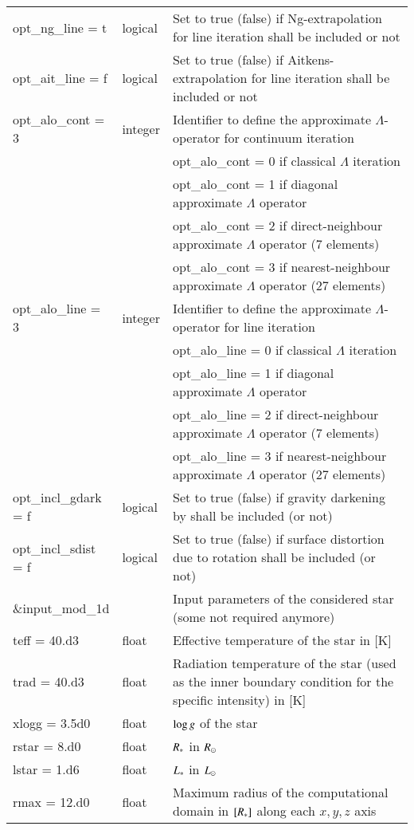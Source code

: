 \documentclass[10pt,a4paper]{article}
\begin{document}
\begin{footnotesize}
\begin{longtable}[h]{p{0.24\linewidth}p{0.07\linewidth}p{0.69\linewidth}}
opt\_ng\_line = t & logical  & Set to true (false) if Ng-extrapolation for line iteration shall be included or not \\
opt\_ait\_line = f & logical & Set to true (false) if Aitkens-extrapolation for line iteration shall be included or not \\
opt\_alo\_cont = 3 & integer & Identifier to define the approximate $\Lambda$-operator for continuum iteration \\
 & & opt\_alo\_cont = 0 if classical $\Lambda$ iteration \\
 & & opt\_alo\_cont = 1 if diagonal approximate $\Lambda$ operator \\
 & & opt\_alo\_cont = 2 if direct-neighbour approximate $\Lambda$ operator (7 elements) \\
 & & opt\_alo\_cont = 3 if nearest-neighbour approximate $\Lambda$ operator (27 elements) \\
opt\_alo\_line = 3 & integer & Identifier to define the approximate $\Lambda$-operator for line iteration \\
 & & opt\_alo\_line = 0 if classical $\Lambda$ iteration \\
 & & opt\_alo\_line = 1 if diagonal approximate $\Lambda$ operator \\
 & & opt\_alo\_line = 2 if direct-neighbour approximate $\Lambda$ operator (7 elements) \\
 & & opt\_alo\_line = 3 if nearest-neighbour approximate $\Lambda$ operator (27 elements) \\
opt\_incl\_gdark = f & logical & Set to true (false) if gravity darkening by \cite{Zeipel24} shall be included (or not) \\
opt\_incl\_sdist = f & logical & Set to true (false) if surface distortion due to rotation shall be included (or not) \\\hline
%
\&input\_mod\_1d & & Input parameters of the considered star (some not required anymore) \\
%
teff = 40.d3 & float & Effective temperature of the star in [K] \\
trad = 40.d3 & float & Radiation temperature of the star (used as the inner boundary condition for the specific intensity) in [K] \\
xlogg = 3.5d0 & float & $\log g$ of the star \\
rstar = 8.d0 & float & $R_{\ast}$ in $R_{\odot}$ \\
lstar = 1.d6 & float & $L_{\ast}$ in $L_{\odot}$ \\
rmax = 12.d0 & float & Maximum radius of the computational domain in $[R_{\ast}]$ along each $x,y,z$ axis \\

\end{longtable}
\end{footnotesize}
\end{document}
